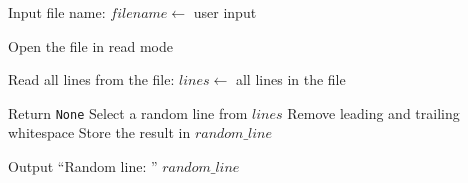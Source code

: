 \begin{algorithm}
\caption{Read a Random Line from a File}
\begin{algorithmic}[1]

\STATE Input file name:
\STATE $filename \gets$ user input

\STATE Open the file in read mode

\STATE Read all lines from the file:
\STATE $lines \gets$ all lines in the file

    \STATE Return \texttt{None}
\ELSE
    \STATE Select a random line from $lines$
    \STATE Remove leading and trailing whitespace
    \STATE Store the result in $random\_line$
\ENDIF

\STATE Output ``Random line: '' $random\_line$

\end{algorithmic}
\end{algorithm}